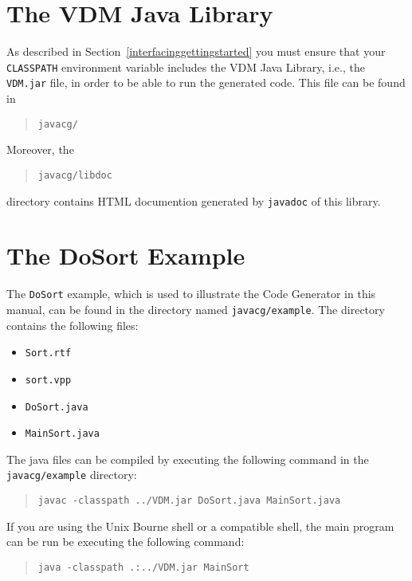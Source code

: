 \documentclass[\pformat,11pt]{article}
\newcommand{\JL}{VDM Java Library}
\begin{document}
\newpage
\section{The VDM Java Library}\label{VDMJavalib}

As described in Section~\ref{interfacinggettingstarted} you must
ensure that your {\tt CLASSPATH} environment variable includes the
\JL{}, i.e., the {\tt VDM.jar} file, in order to be able to run the
generated code.  This file can be found in

\begin{quote}
\begin{verbatim}
javacg/
\end{verbatim}
\end{quote}

Moreover, the 

\begin{quote}
\begin{verbatim}
javacg/libdoc
\end{verbatim}
\end{quote}
directory contains HTML documention generated by {\tt javadoc} of this library.

\newpage
\section{The DoSort Example}\label{dosortexample}
The \texttt{DoSort} example, which is used to illustrate the Code Generator in
this manual, can be found in the directory named {\tt javacg/example}. The
directory contains the following files:

\begin{itemize}
\item {\tt Sort.rtf}
\item {\tt sort.vpp}
\item {\tt DoSort.java}
\item {\tt MainSort.java}
\end{itemize}

The java files can be compiled by executing the following command in the {\tt javacg/example} directory:

\begin{quote}
\begin{verbatim}
javac -classpath ../VDM.jar DoSort.java MainSort.java
\end{verbatim}
\end{quote}

If you are using the Unix Bourne shell or a compatible shell, the main program can be run be executing the following command:
\begin{quote}
\begin{verbatim}
java -classpath .:../VDM.jar MainSort
\end{verbatim}
\end{quote}
\end{document}
